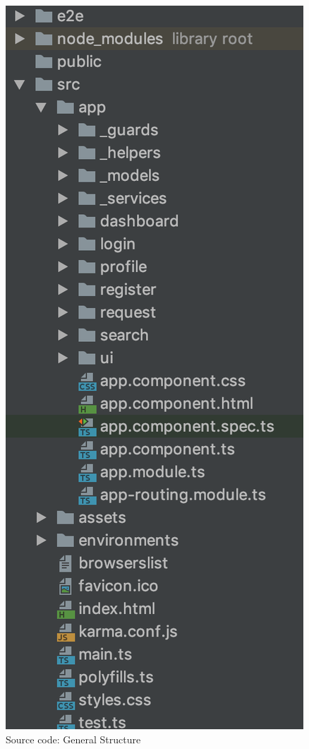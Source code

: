 \documentclass[a4paper, hidelinks, 12pt]{report}
\begin{document}
	\begin{figure}[H]
		\centering
		\includegraphics[scale=0.6]{images/frontend/d4h_source_code_structure.png}
		\caption[Source code: General Structure]{Source code: General Structure}
		\label{fig:d4h_source_code_structure}
	\end{figure}
\end{document}
